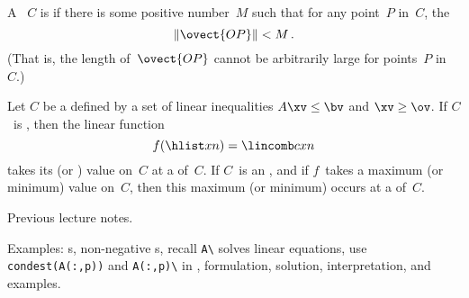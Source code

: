 \begin{definition}
A ~$C$ is  if there is some positive number~$M$ such that for any point~$P$ in~$C$, the 
\[
\|\ovect{OP}\|<M\,.
\]
(That is, the length of~$\ovect{OP}$ cannot be arbitrarily large
for points~$P$ in~$C$.)
\end{definition}

\begin{theorem}\label{convex}
Let $C$ be a  
defined by a set of linear inequalities $A\xv\le \bv$ and $\xv\ge \ov$.
If $C$~is , then the linear function 
\[
f(\hlist xn)=\lincomb cxn
\]
takes its  (or ) value on~$C$ at a  of~$C$. If $C$~is an  , and if $f$~takes a maximum (or minimum) value on~$C$, then this maximum (or minimum) occurs at a  of~$C$.
\end{theorem}

\begin{prof} Previous lecture notes.
\end{prof}

\begin{remark} 
Examples: s, non-negative s, recall \verb|A\| solves linear equations, use \verb|condest(A(:,p))| and \verb|A(:,p)\| in \script, formulation, solution, interpretation, and examples.
\end{remark}


\sectionExercises


